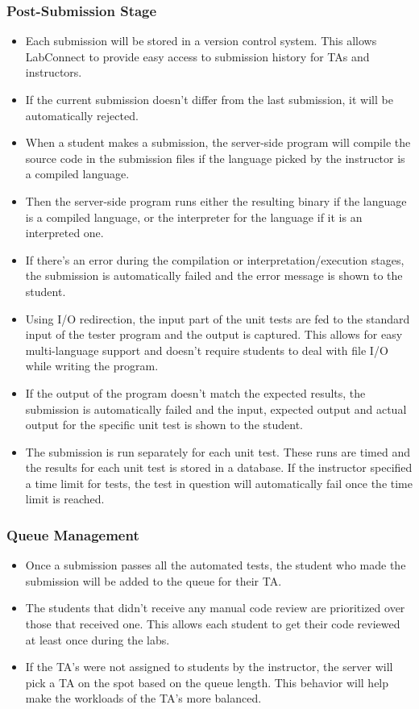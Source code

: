 \documentclass[a4paper, 12pt]{article}
\begin{document}
    \subsubsection{Post-Submission Stage}

    \begin{itemize}
      \item Each submission will be stored in a version control system. This allows LabConnect to provide easy access to
      submission history for TAs and instructors.
      \item If the current submission doesn't differ from the last submission, it will be automatically rejected.
      \item When a student makes a submission, the server-side program will compile the source code in the submission
      files if the language picked by the instructor is a compiled language.
      \item Then the server-side program runs either the resulting binary if the language is a compiled language, or the
      interpreter for the language if it is an interpreted one.
      \item If there's an error during the compilation or interpretation/execution stages, the submission is automatically failed and
      the error message is shown to the student.
      \item Using I/O redirection, the input part of the unit tests are fed to the standard input of the tester program and the output is captured.
      This allows for easy multi-language support and doesn't require students to deal with file I/O while writing the program.
      \item If the output of the program doesn't match the expected results, the submission is automatically failed and the input, expected
      output and actual output for the specific unit test is shown to the student.
      \item The submission is run separately for each unit test. These runs are timed and the results for each unit test is stored in a database.
      If the instructor specified a time limit for tests, the test in question will automatically fail once the time limit is reached.
    \end{itemize}

    \subsubsection{Queue Management}
    \begin{itemize}
      \item Once a submission passes all the automated tests, the student who made the submission will be added to the queue for their TA.
      \item The students that didn't receive any manual code review are prioritized over those that received one. This allows each student to
      get their code reviewed at least once during the labs.
      \item If the TA's were not assigned to students by the instructor, the server will pick a TA on the spot based on the queue length. This
      behavior will help make the workloads of the TA's more balanced.
    \end{itemize}
\end{document}
